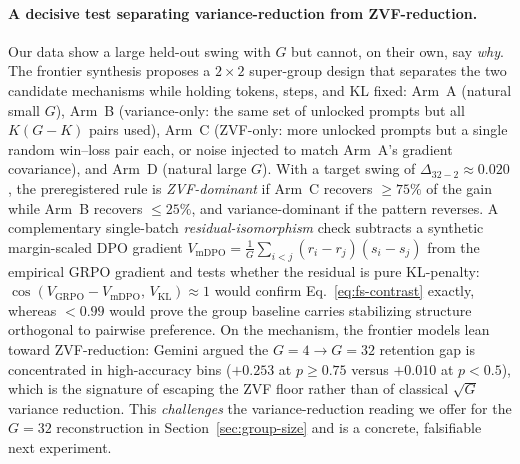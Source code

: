 \documentclass{article}
\begin{document}
\paragraph{A decisive test separating variance-reduction from ZVF-reduction.}
Our data show a large held-out swing with $G$ but cannot, on their own,
say \emph{why}. The frontier synthesis proposes a $2{\times}2$
super-group design that separates the two candidate mechanisms while
holding tokens, steps, and KL fixed: Arm~A (natural small $G$), Arm~B
(variance-only: the same set of unlocked prompts but all $K(G{-}K)$
pairs used), Arm~C (ZVF-only: more unlocked prompts but a single random
win--loss pair each, or noise injected to match Arm~A's gradient
covariance), and Arm~D (natural large $G$). With a target swing of
$\Delta_{32-2}\approx 0.020$, the preregistered rule is
\emph{ZVF-dominant} if Arm~C recovers $\ge 75\%$ of the gain while
Arm~B recovers $\le 25\%$, and variance-dominant if the pattern
reverses. A complementary single-batch \emph{residual-isomorphism}
check subtracts a synthetic margin-scaled DPO gradient
$V_\text{mDPO}=\tfrac{1}{G}\sum_{i<j}(r_i-r_j)(s_i-s_j)$ from the
empirical GRPO gradient and tests whether the residual is pure
KL-penalty: $\cos(V_\text{GRPO}-V_\text{mDPO},\,V_\text{KL})\approx 1$
would confirm Eq.~\eqref{eq:fs-contrast} exactly, whereas $<0.99$ would
prove the group baseline carries stabilizing structure orthogonal to
pairwise preference. On the mechanism, the frontier models lean toward
ZVF-reduction: Gemini argued the $G{=}4\!\to\!G{=}32$ retention gap is
concentrated in high-accuracy bins ($+0.253$ at $p\ge 0.75$ versus
$+0.010$ at $p<0.5$), which is the signature of escaping the ZVF floor
rather than of classical $\sqrt{G}$ variance reduction. This
\emph{challenges} the variance-reduction reading we offer for the
$G{=}32$ reconstruction in Section~\ref{sec:group-size} and is a concrete,
falsifiable next experiment.
\end{document}
